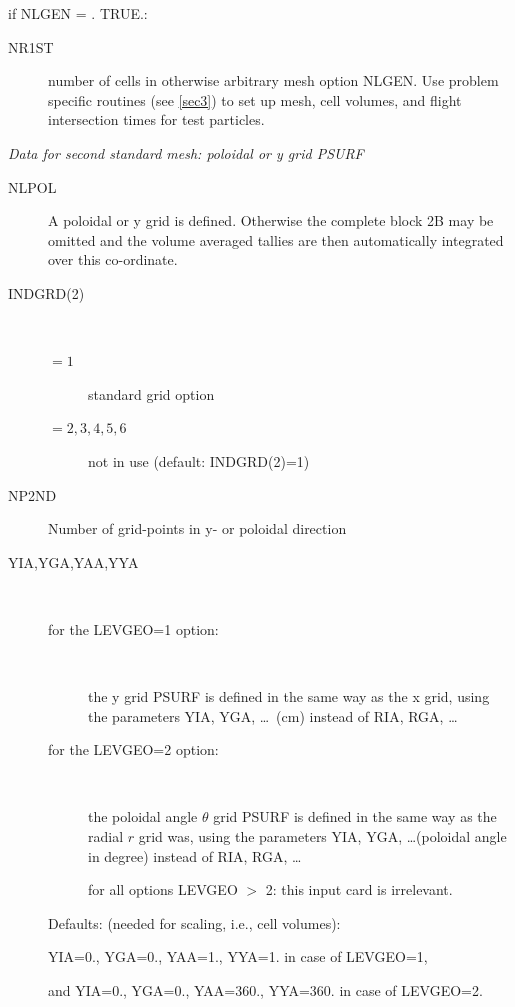 if NLGEN = .
TRUE.:
\begin{description}
  \item[NR1ST] 

        number of cells in otherwise arbitrary mesh option NLGEN.
        Use problem specific routines (see \cref{sec3}) to set up mesh, cell volumes,
        and flight intersection times for test particles.
\end{description}

\textsl{Data for second standard mesh: poloidal or y grid PSURF}
\begin{description}
  \item[NLPOL] A poloidal or y grid is defined.
        Otherwise the complete block 2B may be omitted and the volume averaged tallies
        are then automatically integrated over this co-ordinate.
  \item[INDGRD(2)] ~ 

        \begin{description}
          \item[$= 1$] standard grid option
          \item[$= 2, 3, 4, 5, 6$]
                not in use  (default: INDGRD(2)=1)
        \end{description}
  \item[NP2ND] Number of
        grid-points in y- or poloidal direction
  \item[YIA,YGA,YAA,YYA] ~

        \begin{description}
          \item[for the LEVGEO=1 option:] ~ 

                the y grid PSURF is defined in the same way as the x grid, using the parameters
                YIA, YGA, \dots\ (\si{\centi\metre}) instead of RIA, RGA, \dots

          \item[for the LEVGEO=2 option:] ~ 

                the poloidal angle $\theta$ grid PSURF is defined in the same way as the radial
                $r$ grid was, using the parameters YIA, YGA, \dots(poloidal angle in degree)
                instead of RIA, RGA, \dots 

                for all options LEVGEO $>$ 2:
                this input card is irrelevant.
        \end{description}
        Defaults: (needed for scaling, i.e., cell volumes):

        YIA=0., YGA=0., YAA=1., YYA=1.
        in case of LEVGEO=1,

        and YIA=0., YGA=0., YAA=360., YYA=360. in case of LEVGEO=2.

\end{description}

